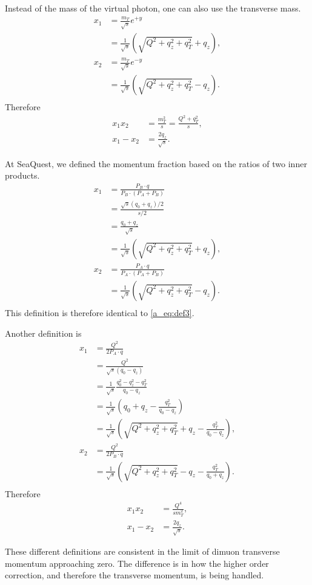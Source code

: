 \documentclass[../main.tex]{subfiles}
\begin{document}
Instead of the mass of the virtual photon, one can also use the transverse mass.
\begin{equation}
	\begin{split}
		x_1 &= \frac{m_T}{\sqrt{s}} e^{+y}\\
		&=\frac{1}{\sqrt{s}}\left(\sqrt{Q^2+q_z^2+q_T^2}+q_z\right),\\
		x_2 &= \frac{m_T}{\sqrt{s}} e^{-y}\\
		&= \frac{1}{\sqrt{s}}\left(\sqrt{Q^2+q_z^2+q_T^2}-q_z\right).\\
	\end{split}
	\label{a_eq:def3}
\end{equation}
Therefore
\begin{equation}
	\begin{split}
		x_1x_2 &= \frac{m_T^2}{s} = \frac{Q^2+q_T^2}{s},\\
		x_1-x_2 &= \frac{2q_z}{\sqrt{s}}.
	\end{split}
\end{equation}


At SeaQuest, we defined the momentum fraction based on the ratios of two inner products.
\begin{equation}
	\begin{split}
		x_1 &= \frac{P_B\cdot q}{P_B\cdot (P_A+P_B)}\\
		&= \frac{\sqrt{s}(q_0+q_z)/2}{s/2}\\
		&= \frac{q_0+q_z}{\sqrt{s}}\\
		&= \frac{1}{\sqrt{s}}\left(\sqrt{Q^2+q_z^2+q_T^2}+q_z\right),\\
		x_2 &= \frac{P_A\cdot q}{P_A\cdot (P_A+P_B)}\\
		&= \frac{1}{\sqrt{s}}\left(\sqrt{Q^2+q_z^2+q_T^2}-q_z\right).\\
	\end{split}
\end{equation}
This definition is therefore identical to \cref{a_eq:def3}.

Another definition is
\begin{equation}
	\begin{split}
		x_1 &= \frac{Q^2}{2P_A \cdot q}\\
		&= \frac{Q^2}{\sqrt{s}(q_0-q_z)}\\
		&= \frac{1}{\sqrt{s}}\frac{q_0^2 -q_z^2 -q_T^2}{q_0-q_z} \\
		&= \frac{1}{\sqrt{s}} \left(q_0+q_z -\frac{q_T^2}{q_0-q_z}\right)\\
		&= \frac{1}{\sqrt{s}}\left(\sqrt{Q^2+q_z^2+q_T^2}+q_z -\frac{q_T^2}{q_0-q_z}\right),\\
		x_2 &= \frac{Q^2}{2P_B \cdot q}\\
		&= \frac{1}{\sqrt{s}}\left(\sqrt{Q^2+q_z^2+q_T^2}-q_z -\frac{q_T^2}{q_0+q_z}\right).\\
	\end{split}
\end{equation}
Therefore
\begin{equation}
	\begin{split}
		x_1x_2 &= \frac{Q^4}{s m_T^2}, \\
		x_1-x_2 &= \frac{2q_z}{\sqrt{s}}.
	\end{split}
\end{equation}

These different definitions are consistent in the limit of dimuon transverse momentum approaching zero.
The difference is in how the higher order correction, and therefore the transverse momentum,
is being handled.
\end{document}
